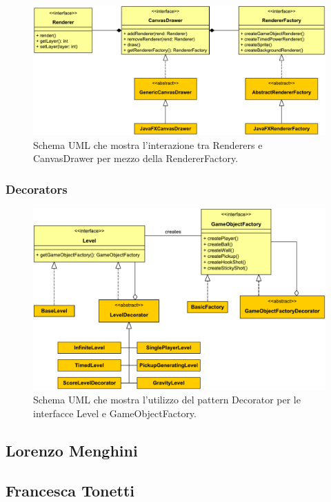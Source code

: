 \documentclass[a4paper,12pt]{report}
\begin{document}
\begin{figure}[H]
\includegraphics[width=\linewidth]{img/canvas_drawer}
\caption{Schema UML che mostra l'interazione tra Renderers e CanvasDrawer per mezzo della RendererFactory.}
\label{img:canvas_drawer}
\end{figure}

\subsubsection*{Decorators}

\begin{figure}[H]
\includegraphics[width=\linewidth]{img/decorator}
\caption{Schema UML che mostra l'utilizzo del pattern Decorator per le interfacce Level e GameObjectFactory.}
\label{img:decorator}
\end{figure}

\subsection*{Lorenzo Menghini}

\subsection*{Francesca Tonetti}
\end{document}
